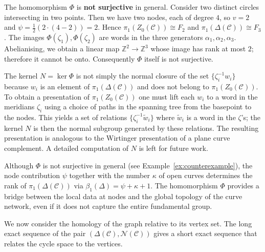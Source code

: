 \documentclass[article,11pt]{amsart} \numberwithin{equation}{section}
\numberwithin{equation}{section}
\begin{document}
{\begin{ex}\label{ex:counterexample}
	The homomorphism \(\Phi\) is \textbf{not surjective} in general.  
	Consider two distinct circles intersecting in two points.  Then we have two nodes, each of degree \(4\), so \(v=2\) and \(\psi = \frac{1}{2}(2\cdot(4-2)) = 2\).  
	Hence \(\pi_1(Z_0(\mathcal{C})) \cong F_2\) and \(\pi_1(\Delta(\mathcal{C})) \cong F_3\).  
	The images \(\Phi(\zeta_1), \Phi(\zeta_2)\) are words in the three generators \(\alpha_1,\alpha_2,\alpha_3\).  
	Abelianising, we obtain a linear map \(\mathbb{Z}^2 \longrightarrow \mathbb{Z}^3\) whose image has rank at most \(2\); therefore it cannot be onto.  
	Consequently \(\Phi\) itself is not surjective.
\end{ex}

\begin{rk}
	The kernel \(N = \ker\Phi\) is not simply the normal closure of the set \(\{\zeta_i^{-1}w_i\}\) because \(w_i\) is an element of \(\pi_1(\Delta(\mathcal{C}))\) and does not belong to \(\pi_1(Z_0(\mathcal{C}))\).  To obtain a presentation of \(\pi_1(Z_0(\mathcal{C}))\) one must lift each \(w_i\) to a word in the meridians \(\zeta_i\) using a choice of paths in the spanning tree from the basepoint to the nodes.  This yields a set of relations \(\{\zeta_i^{-1}\widetilde{w}_i\}\) where \(\widetilde{w}_i\) is a word in the \(\zeta\)'s; the kernel \(N\) is then the normal subgroup generated by these relations.  The resulting presentation is analogous to the Wirtinger presentation of a plane curve complement.  A detailed computation of \(N\) is left for future work.
	
	Although \(\Phi\) is not surjective in general (see Example~\ref{ex:counterexample}), the node contribution \(\psi\) together with the number \(\kappa\) of open curves determines the rank of \(\pi_1(\Delta(\mathcal{C}))\) via \(\beta_1(\Delta)=\psi+\kappa+1\).  The homomorphism \(\Phi\) provides a bridge between the local data at nodes and the global topology of the curve network, even if it does not capture the entire fundamental group.
\end{rk}

We now consider the homology of the graph relative to its vertex set.  The long exact sequence of the pair \((\Delta(\mathcal{C}), \mathcal{N}(\mathcal{C}))\) gives a short exact sequence that relates the cycle space to the vertices.

}
\end{document}
